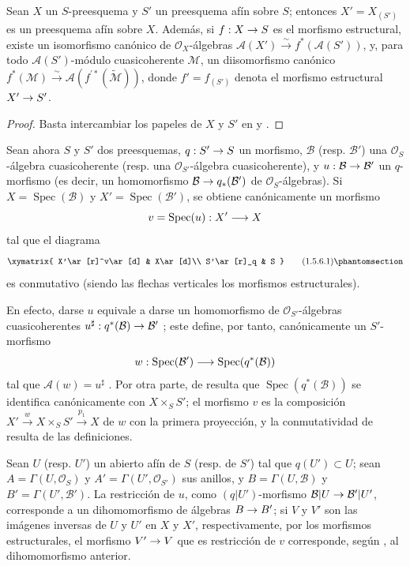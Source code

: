 \documentclass[oneside,10pt]{amsart}
\makeatletter
\newcommand{\ega@arrow}[2]{\mathchoice{#1}{#2}{#2}{#2}}
\renewcommand{\to}{\ega@arrow{\longrightarrow}{\rightarrow}}
\let\EGAOriginalLabel\label
\renewcommand{\label}[1]{\phantomsection\EGAOriginalLabel{#1}}
\makeatother
\begin{document}
\begin{corollary}[1.5.5]
\label{II.1.5.5-fr}
Sean $X$ un $S$-preesquema y $S'$ un preesquema afín sobre $S$; entonces $X'=X_{(S')}$ es un preesquema afín sobre $X$.
Además, si $f:X\to S$ es el morfismo estructural, existe un isomorfismo canónico de $\mathcal{O}_X$-álgebras
$\mathcal{A}(X')\xrightarrow{\sim}f^*(\mathcal{A}(S'))$,
y, para todo $\mathcal{A}(S')$-módulo cuasicoherente $\mathcal{M}$, un diisomorfismo canónico
$f^*(\mathcal{M})\xrightarrow{\sim}
\mathcal{A}(f^{\prime*}(\widetilde{\mathcal{M}}))$,
donde $f'=f_{(S')}$ denota el morfismo estructural $X'\to S'$.
\end{corollary}

\begin{proof}
Basta intercambiar los papeles de $X$ y $S'$ en  y .
\end{proof}

\begin{env}[1.5.6]
\label{II.1.5.6-fr}
Sean ahora $S$ y $S'$ dos preesquemas, $q:S'\to S$ un morfismo, $\mathcal{B}$ (resp. $\mathcal{B}'$) una $\mathcal{O}_S$-álgebra cuasicoherente (resp. una $\mathcal{O}_{S'}$-álgebra cuasicoherente), y $u:\mathcal{B}\to\mathcal{B}'$ un $q$-morfismo (es decir, un homomorfismo $\mathcal{B}\to q_*(\mathcal{B}')$ de $\mathcal{O}_S$-álgebras).
Si $X=\operatorname{Spec}(\mathcal{B})$ y $X'=\operatorname{Spec}(\mathcal{B}')$, se obtiene canónicamente un morfismo
\[
  v=\operatorname{Spec}(u):X'\to X
\]
tal que el diagrama
\[
  \xymatrix{
    X'\ar[r]^v\ar[d] & X\ar[d]\\
    S'\ar[r]_q & S
  }
  \tag{1.5.6.1}\label{II.1.5.6.1-fr}
\]
es conmutativo (siendo las flechas verticales los morfismos estructurales).

En efecto, darse $u$ equivale a darse un homomorfismo de $\mathcal{O}_{S'}$-álgebras cuasicoherentes $u^\sharp:q^*(\mathcal{B})\to\mathcal{B}'$ ; este define, por tanto, canónicamente un $S'$-morfismo
\[
  w:\operatorname{Spec}(\mathcal{B}')\to
  \operatorname{Spec}(q^*(\mathcal{B}))
\]
tal que $\mathcal{A}(w)=u^\sharp$ .
Por otra parte, de  resulta que $\operatorname{Spec}(q^*(\mathcal{B}))$ se identifica canónicamente con $X\times_S S'$; el morfismo $v$ es la composición
$X'\xrightarrow{w}X\times_S S'\xrightarrow{p_1}X$
de $w$ con la primera proyección, y la conmutatividad de  resulta de las definiciones.

Sean $U$ (resp. $U'$) un abierto afín de $S$ (resp. de $S'$) tal que $q(U')\subset U$; sean $A=\Gamma(U,\mathcal{O}_S)$ y $A'=\Gamma(U',\mathcal{O}_{S'})$ sus anillos, y $B=\Gamma(U,\mathcal{B})$ y $B'=\Gamma(U',\mathcal{B}')$.
La restricción de $u$, como $(q|U')$-morfismo $\mathcal{B}|U\to\mathcal{B}'|U'$, corresponde a un dihomomorfismo de álgebras $B\to B'$; si $V$ y $V'$ son las imágenes inversas de $U$ y $U'$ en $X$ y $X'$, respectivamente, por los morfismos estructurales, el morfismo $V'\to V$ que es restricción de $v$ corresponde, según , al dihomomorfismo anterior.
\end{env}
\end{document}
